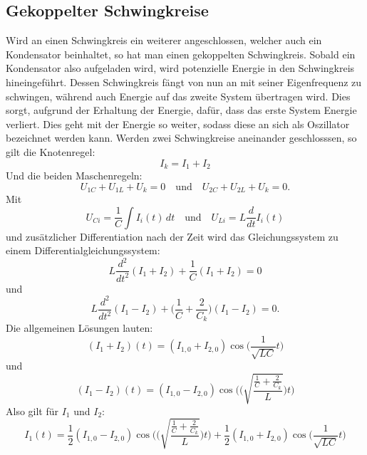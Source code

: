 
\subsection{Gekoppelter Schwingkreise}

Wird an einen Schwingkreis ein weiterer angeschlossen, welcher auch ein Kondensator beinhaltet, so hat man einen gekoppelten Schwingkreis. Sobald ein Kondensator also aufgeladen wird, wird potenzielle Energie in den Schwingkreis hineingeführt. Dessen Schwingkreis fängt von nun an mit seiner Eigenfrequenz zu schwingen, während auch Energie auf das zweite System übertragen wird. Dies sorgt, aufgrund der Erhaltung der Energie, dafür, dass das erste System Energie verliert.
Dies geht mit der Energie so weiter, sodass diese an sich als Oszillator bezeichnet werden kann.
Werden zwei Schwingkreise aneinander geschlosssen, so gilt die Knotenregel:
\begin{equation}
    I_k = I_1 + I_2
\end{equation}
Und die beiden Maschenregeln:
\begin{equation}
    U_{1C} + U_{1L} + U_k = 0
    \quad\textrm{und}\quad
    U_{2C} + U_{2L} + U_k = 0.
\end{equation} 
Mit
\begin{equation}
    U_{Ci} = \frac{1}{C} \int I_i(t) \,{d}t
    \quad\textrm{und}\quad
    U_{Li} = L \frac{d}{dt} I_i(t)
\end{equation}
und zusätzlicher Differentiation nach der Zeit wird das Gleichungssystem zu einem Differentialgleichungssystem:
\begin{equation}
L \frac{d^2}{dt^2} (I_1 + I_2) + \frac{1}{C}(I_1+I_2) = 0
\end{equation}
und
\begin{equation}
L \frac{d^2}{dt^2} (I_1 - I_2) + \Biggl(\frac{1}{C} + \frac{2}{C_k} \Biggr)(I_1 - I_2) = 0.
\end{equation}
Die allgemeinen Lösungen lauten:
\begin{equation}
    (I_1+I_2)(t) = (I_{1,0} + I_{2,0}) \cos\Biggl(\frac{1}{\sqrt{LC}}t\Biggr)
\end{equation}
und
\begin{equation}
    (I_1-I_2)(t) = (I_{1,0} - I_{2,0}) \cos\Biggl(\Biggl(\sqrt{\frac{\frac{1}{C}+\frac{2}{C_k}}{L}}\Biggr)t\Biggr)
\end{equation}
Also gilt für \(I_1\) und \(I_2\):
\begin{equation}
    I_1(t) = \frac{1}{2}(I_{1,0}-I_{2,0})\cos\Biggl(\Biggl(\sqrt{\frac{\frac{1}{C}+\frac{2}{C_k}}{L}}\Biggr)t\Biggr)+\frac{1}{2}(I_{1,0}+I_{2,0})\cos\Biggl(\frac{1}{\sqrt{LC}}t\Biggr)
\end{equation}
